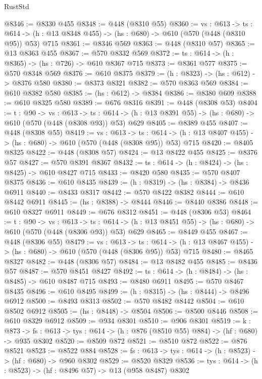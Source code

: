 \begin{lexlean}{RustStd}
\begin{coremodule}
@8346 := @8330 @455
@8348 := @448 (@8310 @55)
@8360 := {vs : @613} ->
  {ts : @614} -> (h : @13 @8348 @455) -> (hs : @680) -> @610 (@570 (@448 (@8310 @95)) @53) @715
@8361 := @8346 @569
@8363 := @448 (@8310 @57)
@8365 := @13 @8363 @455
@8367 := @570 @8332 @569
@8372 := {ts : @614} -> (h : @8365) -> (hs : @726) -> @610 @8367 @715
@8373 := @8361 @577
@8375 := @570 @8348 @569
@8376 := @610 @8375
@8379 := (h : @8323) -> (hs : @612) -> @8376 @580
@8380 := @8373 @8321
@8382 := @570 @8363 @569
@8384 := @610 @8382 @580
@8385 := (hs : @612) -> @8384
@8386 := @8380 @609
@8388 := @610 @8325 @580
@8389 := @676 @8316
@8391 := @448 (@8308 @53)
@8404 := {t : @90} ->
  {vs : @613} ->
  {ts : @614} -> (h : @13 @8391 @55) -> (hs : @680) -> @610 (@570 (@448 (@8308 @93)) @53) @629
@8405 := @8389 @455
@8407 := @448 (@8308 @55)
@8419 := {vs : @613} ->
  {ts : @614} -> (h : @13 @8407 @455) -> (hs : @680) -> @610 (@570 (@448 (@8308 @95)) @53) @715
@8420 := @8405 @8325
@8422 := @448 (@8308 @57)
@8424 := @13 @8422 @455
@8425 := @8376 @57
@8427 := @570 @8391 @8367
@8432 := {ts : @614} -> (h : @8424) -> (hs : @8425) -> @610 @8427 @715
@8433 := @8420 @580
@8435 := @570 @8407 @8375
@8436 := @610 @8435
@8439 := (h : @8319) -> (hs : @8384) -> @8436 @6911
@8440 := @8433 @8317
@8442 := @570 @8422 @8382
@8444 := @610 @8442 @6911
@8445 := (hs : @8388) -> @8444
@8446 := @8440 @8386
@8448 := @610 @8327 @6911
@8449 := @676 @8312
@8451 := @448 (@8306 @53)
@8464 := {t : @90} ->
  {vs : @613} ->
  {ts : @614} -> (h : @13 @8451 @55) -> (hs : @680) -> @610 (@570 (@448 (@8306 @93)) @53) @629
@8465 := @8449 @455
@8467 := @448 (@8306 @55)
@8479 := {vs : @613} ->
  {ts : @614} -> (h : @13 @8467 @455) -> (hs : @680) -> @610 (@570 (@448 (@8306 @95)) @53) @715
@8480 := @8465 @8327
@8482 := @448 (@8306 @57)
@8484 := @13 @8482 @455
@8485 := @8436 @57
@8487 := @570 @8451 @8427
@8492 := {ts : @614} -> (h : @8484) -> (hs : @8485) -> @610 @8487 @715
@8493 := @8480 @6911
@8495 := @570 @8467 @8435
@8496 := @610 @8495
@8499 := (h : @8315) -> (hs : @8444) -> @8496 @6912
@8500 := @8493 @8313
@8502 := @570 @8482 @8442
@8504 := @610 @8502 @6912
@8505 := (hs : @8448) -> @8504
@8506 := @8500 @8446
@8508 := @610 @8329 @6912
@8509 := @934 @8301
@8510 := @906 @8301
@8519 := {k : @873} ->
  {fs : @613} -> {tys : @614} -> (h : @876 (@8510 @55) @884) -> (hf : @680) -> @935 @8302
@8520 := @8509 @872
@8521 := @8510 @872
@8522 := @876 @8521
@8523 := @8522 @884
@8528 := {fs : @613} -> {tys : @614} -> (h : @8523) -> (hf : @680) -> @960 @8302
@8529 := @8520 @8329
@8536 := {tys : @614} -> (h : @8523) -> (hf : @8496 @57) -> @13 (@958 @8487) @8302

\end{coremodule}
\end{lexlean}
